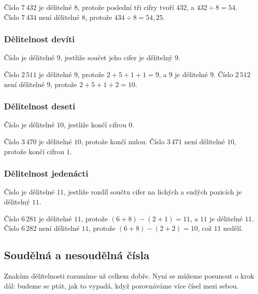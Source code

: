 \documentclass[12pt,a4paper]{article}
\begin{document}
\begin{examplebox}
Číslo $7\,432$ je dělitelné $8$, protože poslední tři cifry tvoří $432$, a $432 \div 8 = 54$.  
Číslo $7\,434$ není dělitelné $8$, protože $434 \div 8 = 54{,}25$.
\end{examplebox}

\subsubsection*{Dělitelnost devíti}
Číslo je dělitelné $9$, jestliže součet jeho cifer je dělitelný $9$.  

\begin{examplebox}
Číslo $2\,511$ je dělitelné $9$, protože $2+5+1+1=9$, a $9$ je dělitelné $9$.  
Číslo $2\,512$ není dělitelné $9$, protože $2+5+1+2=10$.
\end{examplebox}

\subsubsection*{Dělitelnost deseti}
Číslo je dělitelné $10$, jestliže končí cifrou $0$.  

\begin{examplebox}
Číslo $3\,470$ je dělitelné $10$, protože končí nulou.  
Číslo $3\,471$ není dělitelné $10$, protože končí cifrou $1$.
\end{examplebox}

\subsubsection*{Dělitelnost jedenácti}
Číslo je dělitelné $11$, jestliže rozdíl součtu cifer na lichých a sudých pozicích je dělitelný $11$.  

\begin{examplebox}
Číslo $6\,281$ je dělitelné $11$, protože $(6+8) - (2+1) = 11$, a $11$ je dělitelné $11$.  
Číslo $6\,282$ není dělitelné $11$, protože $(6+8) - (2+2) = 10$, což $11$ nedělí.
\end{examplebox}

\subsection{Soudělná a nesoudělná čísla}

Znakům dělitelnosti rozumíme už celkem dobře. Nyní se můžeme posunout o krok dál:  
budeme se ptát, jak to vypadá, když porovnáváme více čísel mezi sebou.  
\end{document}

